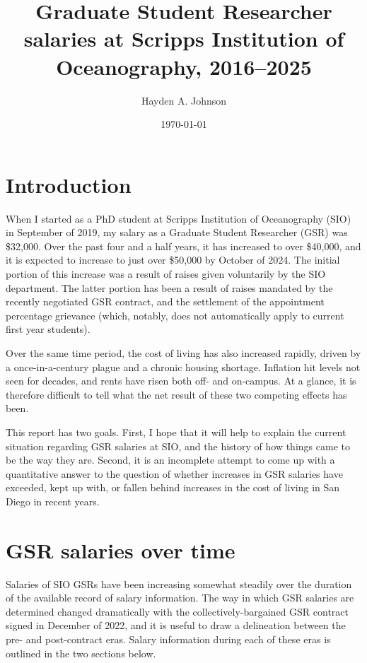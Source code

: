 \documentclass{article}
\title{Graduate Student Researcher salaries at Scripps Institution of Oceanography, 2016--2025}
\author{Hayden A. Johnson}
\date{\today}
\begin{document}
\maketitle

\section{Introduction}

When I started as a PhD student at Scripps Institution of Oceanography (SIO) in September of 2019, my salary as a Graduate Student Researcher (GSR) was \$32,000. Over the past four and a half years, it has increased to over \$40,000, and it is expected to increase to just over \$50,000 by October of 2024. The initial portion of this increase was a result of raises given voluntarily by the SIO department. The latter portion has been a result of raises mandated by the recently negotiated GSR contract, and the settlement of the appointment percentage grievance (which, notably, does not automatically apply to current first year students).

Over the same time period, the cost of living has also increased rapidly, driven by a once-in-a-century plague and a chronic housing shortage. Inflation hit levels not seen for decades, and rents have risen both off- and on-campus. At a glance, it is therefore difficult to tell what the net result of these two competing effects has been.

This report has two goals. First, I hope that it will help to explain the current situation regarding GSR salaries at SIO, and the history of how things came to be the way they are. Second, it is an incomplete attempt to come up with a quantitative answer to the question of whether increases in GSR salaries have exceeded, kept up with, or fallen behind increases in the cost of living in San Diego in recent years.

\section{GSR salaries over time}

Salaries of SIO GSRs have been increasing somewhat steadily over the duration of the available record of salary information. The way in which GSR salaries are determined changed dramatically with the collectively-bargained GSR contract signed in December of 2022, and it is useful to draw a delineation between the pre- and post-contract eras. Salary information during each of these eras is outlined in the two sections below.
\end{document}
